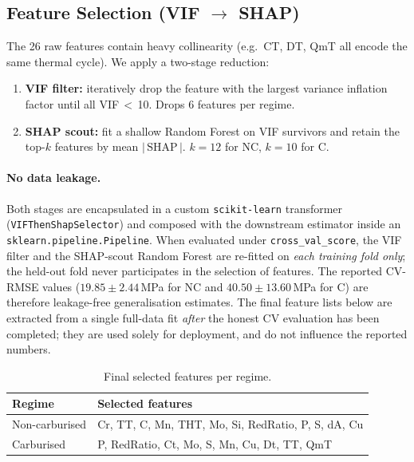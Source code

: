 \documentclass[12pt,a4paper]{article}
\begin{document}
\subsection{Feature Selection \texorpdfstring{(VIF $\rightarrow$ SHAP)}{(VIF to SHAP)}}
The 26 raw features contain heavy collinearity (e.g.\ CT, DT, QmT all encode the same
thermal cycle). We apply a two-stage reduction:
\begin{enumerate}[nosep]
  \item \textbf{VIF filter:} iteratively drop the feature with the largest variance
        inflation factor until all VIF\,$<$\,10. Drops 6 features per regime.
  \item \textbf{SHAP scout:} fit a shallow Random Forest on VIF survivors and retain the
        top-$k$ features by mean $|\,\text{SHAP}\,|$. $k=12$ for NC, $k=10$ for C.
\end{enumerate}

\paragraph{No data leakage.} Both stages are encapsulated in a custom
\texttt{scikit-learn} transformer (\texttt{VIFThenShapSelector}) and composed with the
downstream estimator inside an \texttt{sklearn.pipeline.Pipeline}. When evaluated under
\texttt{cross\_val\_score}, the VIF filter and the SHAP-scout Random Forest are
re-fitted on \emph{each training fold only}; the held-out fold never participates in the
selection of features. The reported CV-RMSE values ($19.85 \pm 2.44$\,MPa for NC and
$40.50 \pm 13.60$\,MPa for C) are therefore leakage-free generalisation estimates.
The final feature lists below are extracted from a single full-data fit \emph{after}
the honest CV evaluation has been completed; they are used solely for deployment, and
do not influence the reported numbers.

\begin{table}[H]
\centering
\caption{Final selected features per regime.}
\label{tab:features}
\begin{tabular}{ll}
\toprule
\textbf{Regime} & \textbf{Selected features} \\
\midrule
Non-carburised & Cr, TT, C, Mn, THT, Mo, Si, RedRatio, P, S, dA, Cu \\
Carburised     & P, RedRatio, Ct, Mo, S, Mn, Cu, Dt, TT, QmT \\
\bottomrule
\end{tabular}
\end{table}
\end{document}
